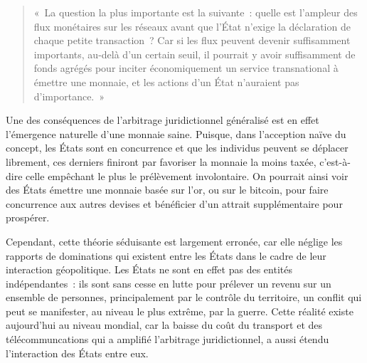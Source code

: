 \begin{quote}
«~La question la plus importante est la suivante~: quelle est l'ampleur des flux monétaires sur les réseaux avant que l'État n'exige la déclaration de chaque petite transaction~? Car si les flux peuvent devenir suffisamment importants, au-delà d'un certain seuil, il pourrait y avoir suffisamment de fonds agrégés pour inciter économiquement un service transnational à émettre une monnaie, et les actions d'un État n'auraient pas d'importance.~»
\end{quote} %

Une des conséquences de l'arbitrage juridictionnel généralisé est en effet l'émergence naturelle d'une monnaie saine. Puisque, dans l'acception naïve du concept, les États sont en concurrence et que les individus peuvent se déplacer librement, ces derniers finiront par favoriser la monnaie la moins taxée, c'est-à-dire celle empêchant le plus le prélèvement involontaire. On pourrait ainsi voir des États émettre une monnaie basée sur l'or, ou sur le bitcoin, pour faire concurrence aux autres devises et bénéficier d'un attrait supplémentaire pour prospérer.


Cependant, cette théorie séduisante est largement erronée, car elle néglige les rapports de dominations qui existent entre les États dans le cadre de leur interaction géopolitique. Les États ne sont en effet pas des entités indépendantes~: ils sont sans cesse en lutte pour prélever un revenu sur un ensemble de personnes, principalement par le contrôle du territoire, un conflit qui peut se manifester, au niveau le plus extrême, par la guerre. Cette réalité existe aujourd'hui au niveau mondial, car la baisse du coût du transport et des télécommuncations qui a amplifié l'arbitrage juridictionnel, a aussi étendu l'interaction des États entre eux.

